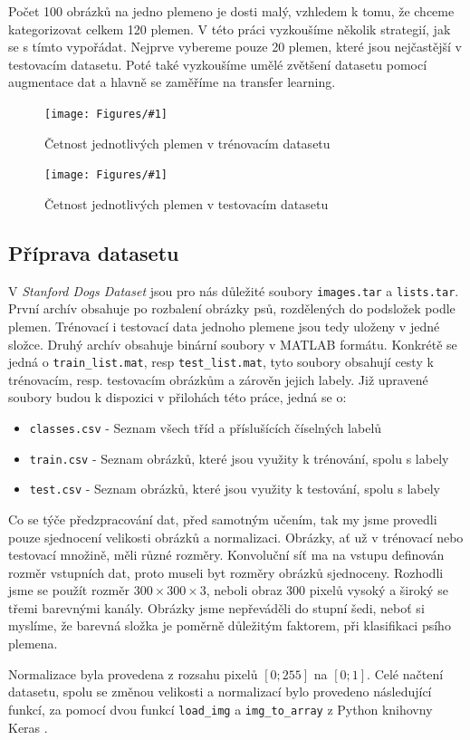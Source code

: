 \documentclass[a4paper,12pt]{article}
\newcommand{\imageSDW}[4]{\begin{figure} \centering \texttt{[image: Figures/\#1]} \caption{#2} \label{#3} \end{figure}}
\begin{document}
Počet 100 obrázků na jedno plemeno je dosti malý, vzhledem k tomu, že chceme kategorizovat celkem 120 plemen. V této práci vyzkoušíme několik strategií, jak se s tímto vypořádat. Nejprve vybereme pouze 20 plemen, které jsou nejčastější v testovacím datasetu. Poté také vyzkoušíme umělé zvětšení datasetu pomocí augmentace dat a hlavně se zaměříme na transfer learning.

\imageSDW{train_distribution.pdf}{Četnost jednotlivých plemen v trénovacím datasetu}{fig:train_breed_dist}{1.0}
\imageSDW{test_distribution.pdf}{Četnost jednotlivých plemen v testovacím datasetu}{fig:test_breed_dist}{1.0}

\newpage
\subsection{Příprava datasetu}
V \emph{Stanford Dogs Dataset} jsou pro nás důležité soubory \texttt{images.tar} a \texttt{lists.tar}. První archív obsahuje po rozbalení obrázky psů, rozdělených do podsložek podle plemen. Trénovací i testovací data jednoho plemene jsou tedy uloženy v jedné složce. Druhý archív obsahuje binární soubory v MATLAB formátu.
Konkrétě se jedná o \texttt{train\_list.mat}, resp \texttt{test\_list.mat}, tyto soubory obsahují cesty k trénovacím, resp. testovacím obrázkům a zárověn jejich labely. Již upravené soubory budou k dispozici v přilohách této práce, jedná se o:
\begin{itemize}
    \item \texttt{classes.csv} - Seznam všech tříd a příslušících číselných labelů
    \item \texttt{train.csv} - Seznam obrázků, které jsou využity k trénování, spolu s labely
    \item \texttt{test.csv} - Seznam obrázků, které jsou využity k testování, spolu s labely
\end{itemize}

Co se týče předzpracování dat, před samotným učením, tak my jsme provedli pouze sjednocení velikosti obrázků a normalizaci.
Obrázky, ať už v trénovací nebo testovací množině, měli různé rozměry. Konvoluční síť ma na vstupu definován rozměr vstupních dat, proto museli
byt rozměry obrázků sjednoceny. Rozhodli jsme se použít rozměr $300 \times 300 \times 3$, neboli obraz 300 pixelů vysoký a široký se třemi barevnými kanály.
Obrázky jsme nepřeváděli do stupní šedi, neboť si myslíme, že barevná složka je poměrně důležitým faktorem, při klasifikaci psího plemena.

Normalizace byla provedena z rozsahu pixelů $[0;255]$ na $[0;1]$. Celé načtení datasetu, spolu se změnou velikosti a normalizací bylo provedeno následující funkcí,
za pomocí dvou funkcí \texttt{load\_img} a \texttt{img\_to\_array} z Python knihovny Keras \cite{chollet2015keras}.
\end{document}
